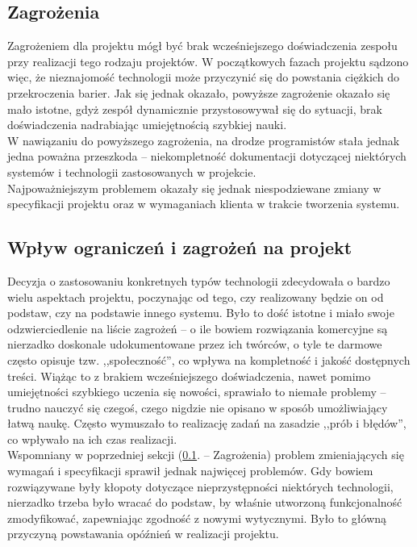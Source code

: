 \subsection{Zagrożenia}
\label{Chapter122}

Zagrożeniem dla projektu mógł być brak wcześniejszego doświadczenia zespołu przy realizacji tego rodzaju projektów. W początkowych fazach projektu sądzono więc, że nieznajomość technologii może przyczynić się do powstania ciężkich do przekroczenia barier. Jak się jednak okazało, powyższe zagrożenie okazało się mało istotne, gdyż zespół dynamicznie przystosowywał się do sytuacji, brak doświadczenia nadrabiając umiejętnością szybkiej nauki. \\

W nawiązaniu do powyższego zagrożenia, na drodze programistów stała jednak jedna poważna przeszkoda -- niekompletność dokumentacji dotyczącej niektórych systemów i technologii zastosowanych w projekcie. \\

Najpoważniejszym problemem okazały się jednak niespodziewane zmiany w specyfikacji projektu oraz w wymaganiach klienta w trakcie tworzenia systemu.

\subsection{Wpływ ograniczeń i zagrożeń na projekt}
\label{Chapter123}

Decyzja o zastosowaniu konkretnych typów technologii zdecydowała o bardzo wielu aspektach projektu, poczynając od tego, czy realizowany będzie on od podstaw, czy na podstawie innego systemu. Było to dość istotne i miało swoje odzwierciedlenie na liście zagrożeń -- o ile bowiem rozwiązania komercyjne są nierzadko doskonale udokumentowane przez ich twórców, o tyle te darmowe często opisuje tzw. ,,społeczność'', co wpływa na kompletność i jakość dostępnych treści. Wiążąc to z brakiem wcześniejszego doświadczenia, nawet pomimo umiejętności szybkiego uczenia się nowości, sprawiało to niemałe problemy -- trudno nauczyć się czegoś, czego nigdzie nie opisano w sposób umożliwiający łatwą naukę. Często wymuszało to realizację zadań na zasadzie ,,prób i błędów'', co wpływało na ich czas realizacji. \\

Wspomniany w poprzedniej sekcji (\ref{Chapter122}. -- Zagrożenia) problem zmieniających się wymagań i specyfikacji sprawił jednak najwięcej problemów. Gdy bowiem rozwiązywane były kłopoty dotyczące nieprzystępności niektórych technologii, nierzadko trzeba było wracać do podstaw, by właśnie utworzoną funkcjonalność zmodyfikować, zapewniając zgodność z nowymi wytycznymi. Było to główną przyczyną powstawania opóźnień w realizacji projektu.

